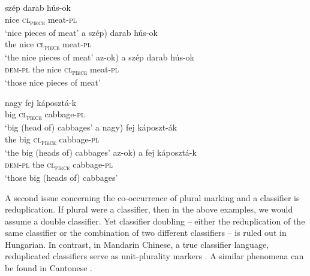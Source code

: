 \documentclass[output=paper]{langscibook}
\begin{document}
\ea \label{schv-nem:ex:21}
\ea \label{schv-nem:ex:21a}
\gll  szép darab hús-ok \\  
nice \textsc{cl\textsubscript{piece}}  meat-\textsc{pl}\\ 
\glt `nice pieces of meat'
\ex \label{schv-nem:ex:21b}
\gll a \minsp{(} szép) darab hús-ok \\
the {} nice \textsc{cl\textsubscript{piece}} meat-\textsc{pl}\\
\glt `the nice pieces of meat'
\ex \label{schv-nem:ex:21c}
\gll \minsp{(} az-ok) a szép darab hús-ok \\
{} \textsc{dem}-\textsc{pl} the nice \textsc{cl\textsubscript{piece}} meat-\textsc{pl}\\
\glt `those nice pieces of meat'
\z
\z

\ea \label{schv-nem:ex:22}
\ea \label{schv-nem:ex:22a}
\gll nagy fej káposztá-k \\  
big \textsc{cl\textsubscript{piece}} cabbage-\textsc{pl}\\ 
\glt `big (head of) cabbages'
\ex \label{schv-nem:ex:22b}
\gll a \minsp{(} nagy) fej káposzt-ák     \\
the {} big \textsc{cl\textsubscript{piece}} cabbage-\textsc{pl}\\
\glt `the big (heads of) cabbages'
\ex \label{schv-nem:ex:22c}
\gll \minsp{(} az-ok) a fej káposztá-k \\
{} \textsc{dem}-\textsc{pl} the \textsc{cl\textsubscript{piece}} cabbage-\textsc{pl}\\
\glt `those big (heads of) cabbages'
\z
\z

\noindent A second issue concerning the co-occurrence of plural marking and a classifier is reduplication. If plural were a classifier, then in the above examples, we would assume a double classifier. Yet classifier doubling -- either the reduplication of the same classifier  or the combination of two different classifiers  -- is ruled out in Hungarian. In contrast, in Mandarin Chinese, a true classifier language, reduplicated classifiers serve as unit-plurality markers  \citep{zhang-13}. A similar phenomena can be found in Cantonese  \citep{wong-98}.

\ea \label{schv-nem:ex:23}
  \label{schv-nem:ex:23a}
  \label{schv-nem:ex:23b}
\z
\z
\end{document}
